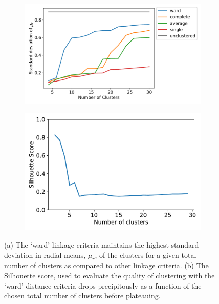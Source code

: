 \documentclass{article}
\begin{document}
  \begin{figure}
  \centering
  \begin{subfigure}{0.53\textwidth}
  \includegraphics[width=\textwidth]{rspread_nclusters.pdf}
  \caption{}\label{fig:rspread}
  \end{subfigure}
  \begin{subfigure}{0.45\textwidth}
  \includegraphics[width=\textwidth]{silhouette_MET.pdf}
  \caption{}\label{fig:silhouette_MET}
  \end{subfigure}
  \caption{(a) The `ward' linkage criteria maintains the highest standard 
  deviation in radial means, $\mu_r$, of the clusters for a given total 
  number of clusters as compared to other linkage criteria. (b) The 
  Silhouette score, used to evaluate the quality of clustering with the 
  `ward' distance criteria drops precipitously as a function of the chosen
  total number of clusters before plateauing.}\label{fig:idk}
  \end{figure}
  
\end{document}
